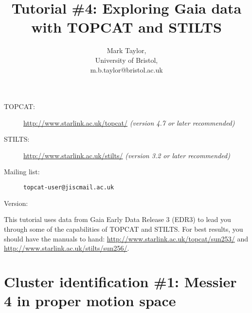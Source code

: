 \documentclass{article}
\newcommand{\turl}[1]{{\color{blue}\url{#1}}}
\begin{document}
\raggedright

\title{Tutorial \#4: Exploring Gaia data with TOPCAT and STILTS}
\author{Mark Taylor,\\
        University of Bristol,\\
        m.b.taylor@bristol.ac.uk}
\date{\vspace*{-4ex}}  %

\maketitle

\begin{description}
  \item[TOPCAT:] \turl{http://www.starlink.ac.uk/topcat/}
                 {\em (version 4.7 or later recommended)}
  \item[STILTS:] \turl{http://www.starlink.ac.uk/stilts/}
                 {\em (version 3.2 or later recommended)}
  \item[Mailing list:] {\tt topcat-user@jiscmail.ac.uk}
  \item[Version:] {\tt }
\end{description}

\tableofcontents

\vspace{3ex}
This tutorial uses data from Gaia Early Data Release 3 (EDR3) \cite{edr3}
to lead you through some of the capabilities of TOPCAT and STILTS.
For best results, you should have the manuals to hand:
\url{http://www.starlink.ac.uk/topcat/sun253/} and
\url{http://www.starlink.ac.uk/stilts/sun256/}.

\newpage

\section{Cluster identification \#1: Messier 4 in proper motion space}
\label{sec:m4}
\end{document}
